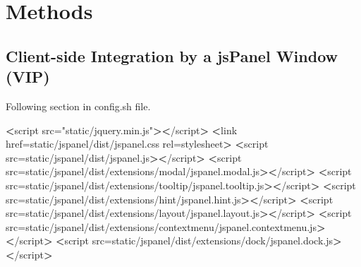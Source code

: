 \documentclass[
]{article}
\newenvironment{Shaded}{\begin{snugshade}}{\end{snugshade}}
\newcommand{\NormalTok}[1]{#1}
\newcommand{\OperatorTok}[1]{\textcolor[rgb]{0.81,0.36,0.00}{\textbf{#1}}}
\newcommand{\StringTok}[1]{\textcolor[rgb]{0.31,0.60,0.02}{#1}}
\newcommand{\VariableTok}[1]{\textcolor[rgb]{0.00,0.00,0.00}{#1}}
\begin{document}
\hypertarget{methods}{%
\section{Methods}\label{methods}}

\hypertarget{client-side-integration-by-a-jspanel-window-vip}{%
\subsection*{Client-side Integration by a jsPanel Window (VIP)}\label{client-side-integration-by-a-jspanel-window-vip}}

Following section in config.sh file.

\begin{Shaded}
\begin{Highlighting}[]
\OperatorTok{\textless{}}\NormalTok{script }\VariableTok{src=}\StringTok{"static/jquery.min.js"}\OperatorTok{\textgreater{}\textless{}}\NormalTok{/script}\OperatorTok{\textgreater{}}
\OperatorTok{\textless{}}\NormalTok{link }\VariableTok{href=}\StringTok{\textquotesingle{}static/jspanel/dist/jspanel.css\textquotesingle{}} \VariableTok{rel=}\StringTok{\textquotesingle{}stylesheet\textquotesingle{}}\OperatorTok{\textgreater{}}
\OperatorTok{\textless{}}\NormalTok{script }\VariableTok{src=}\StringTok{\textquotesingle{}static/jspanel/dist/jspanel.js\textquotesingle{}}\OperatorTok{\textgreater{}\textless{}}\NormalTok{/script}\OperatorTok{\textgreater{}}
\OperatorTok{\textless{}}\NormalTok{script }\VariableTok{src=}\StringTok{\textquotesingle{}static/jspanel/dist/extensions/modal/jspanel.modal.js\textquotesingle{}}\OperatorTok{\textgreater{}\textless{}}\NormalTok{/script}\OperatorTok{\textgreater{}}
\OperatorTok{\textless{}}\NormalTok{script }\VariableTok{src=}\StringTok{\textquotesingle{}static/jspanel/dist/extensions/tooltip/jspanel.tooltip.js\textquotesingle{}}\OperatorTok{\textgreater{}\textless{}}\NormalTok{/script}\OperatorTok{\textgreater{}}
\OperatorTok{\textless{}}\NormalTok{script }\VariableTok{src=}\StringTok{\textquotesingle{}static/jspanel/dist/extensions/hint/jspanel.hint.js\textquotesingle{}}\OperatorTok{\textgreater{}\textless{}}\NormalTok{/script}\OperatorTok{\textgreater{}}
\OperatorTok{\textless{}}\NormalTok{script }\VariableTok{src=}\StringTok{\textquotesingle{}static/jspanel/dist/extensions/layout/jspanel.layout.js\textquotesingle{}}\OperatorTok{\textgreater{}\textless{}}\NormalTok{/script}\OperatorTok{\textgreater{}}
\OperatorTok{\textless{}}\NormalTok{script }\VariableTok{src=}\StringTok{\textquotesingle{}static/jspanel/dist/extensions/contextmenu/jspanel.contextmenu.js\textquotesingle{}}\OperatorTok{\textgreater{}\textless{}}\NormalTok{/script}\OperatorTok{\textgreater{}}
\OperatorTok{\textless{}}\NormalTok{script }\VariableTok{src=}\StringTok{\textquotesingle{}static/jspanel/dist/extensions/dock/jspanel.dock.js\textquotesingle{}}\OperatorTok{\textgreater{}\textless{}}\NormalTok{/script}\OperatorTok{\textgreater{}}
\end{Highlighting}
\end{Shaded}
\end{document}
